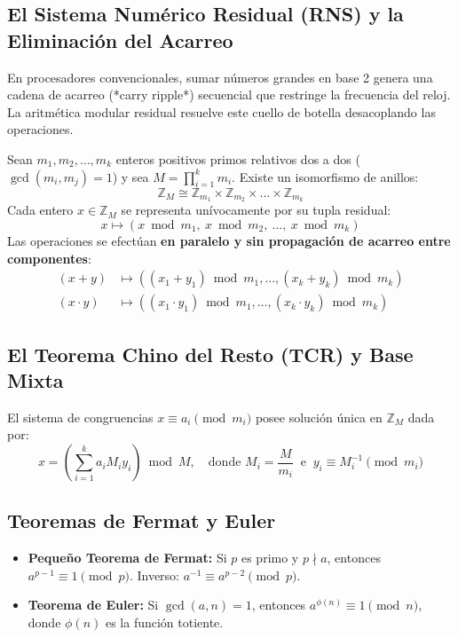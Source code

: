 \documentclass[11pt,a4paper]{article}
\begin{document}
\subsection{El Sistema Numérico Residual (RNS) y la Eliminación del Acarreo}
En procesadores convencionales, sumar números grandes en base 2 genera una cadena de acarreo (*carry ripple*) secuencial que restringe la frecuencia del reloj. La aritmética modular residual resuelve este cuello de botella desacoplando las operaciones.

\begin{teorema}
Sean $m_1, m_2, \dots, m_k$ enteros positivos primos relativos dos a dos ($\gcd(m_i, m_j) = 1$) y sea $M = \prod_{i=1}^k m_i$. Existe un isomorfismo de anillos:
\begin{equation}
  \mathbb{Z}_M \cong \mathbb{Z}_{m_1} \times \mathbb{Z}_{m_2} \times \dots \times \mathbb{Z}_{m_k}
\end{equation}
Cada entero $x \in \mathbb{Z}_M$ se representa unívocamente por su tupla residual:
\begin{equation*}
  x \mapsto (x \bmod m_1, \ x \bmod m_2, \ \dots, \ x \bmod m_k)
\end{equation*}
Las operaciones se efectúan \textbf{en paralelo y sin propagación de acarreo entre componentes}:
\begin{align*}
  (x + y) &\mapsto ((x_1 + y_1) \bmod m_1, \dots, (x_k + y_k) \bmod m_k) \\
  (x \cdot y) &\mapsto ((x_1 \cdot y_1) \bmod m_1, \dots, (x_k \cdot y_k) \bmod m_k)
\end{align*}
\end{teorema}

\subsection{El Teorema Chino del Resto (TCR) y Base Mixta}
\begin{teorema}
El sistema de congruencias $x \equiv a_i \pmod{m_i}$ posee solución única en $\mathbb{Z}_M$ dada por:
\begin{equation}
  x = \left( \sum_{i=1}^k a_i M_i y_i \right) \bmod M, \quad \text{donde } M_i = \frac{M}{m_i} \ \text{ e } \ y_i \equiv M_i^{-1} \pmod{m_i}
\end{equation}
\end{teorema}

\subsection{Teoremas de Fermat y Euler}
\begin{itemize}[noitemsep]
  \item \textbf{Pequeño Teorema de Fermat:} Si $p$ es primo y $p \nmid a$, entonces $a^{p-1} \equiv 1 \pmod p$. Inverso: $a^{-1} \equiv a^{p-2} \pmod p$.
  \item \textbf{Teorema de Euler:} Si $\gcd(a, n) = 1$, entonces $a^{\phi(n)} \equiv 1 \pmod n$, donde $\phi(n)$ es la función totiente.
\end{itemize}
\end{document}
